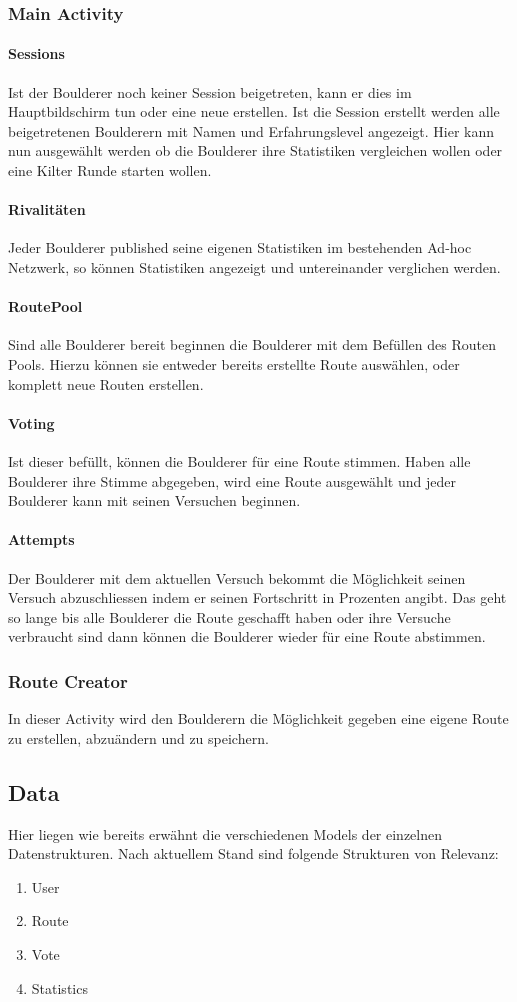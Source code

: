 \documentclass[11pt,a4paper,headsepline,footsepline,bibliography=totocnumbered]{article}
\newcommand{\subsubsubsection}[1]{\paragraph{#1}\mbox{}}
\begin{document}
    \newpage
    \subsubsection{Main Activity}

      \subsubsubsection{Sessions}
        \par
          Ist der Boulderer noch keiner Session beigetreten, kann er dies im Hauptbildschirm tun oder eine neue erstellen.
          Ist die Session erstellt werden alle beigetretenen Boulderern mit Namen und Erfahrungslevel angezeigt.
          Hier kann nun ausgewählt werden ob die Boulderer ihre Statistiken vergleichen wollen oder eine Kilter Runde starten wollen.

      \subsubsubsection{Rivalitäten}
        \par
          Jeder Boulderer published seine eigenen Statistiken im bestehenden Ad-hoc Netzwerk, so können Statistiken angezeigt und untereinander verglichen werden.

      \subsubsubsection{RoutePool}
        \par
          Sind alle Boulderer bereit beginnen die Boulderer mit dem Befüllen des Routen Pools.
          Hierzu können sie entweder bereits erstellte Route auswählen, oder komplett neue Routen erstellen.

      \subsubsubsection{Voting}
        \par
          Ist dieser befüllt, können die Boulderer für eine Route stimmen.
          Haben alle Boulderer ihre Stimme abgegeben, wird eine Route ausgewählt und jeder Boulderer kann mit seinen Versuchen beginnen.

      \subsubsubsection{Attempts}
        \par
          Der Boulderer mit dem aktuellen Versuch bekommt die Möglichkeit seinen Versuch abzuschliessen indem er seinen Fortschritt in Prozenten angibt.
          Das geht so lange bis alle Boulderer die Route geschafft haben oder ihre Versuche verbraucht sind dann können die Boulderer wieder für eine Route abstimmen.

    \subsubsection{Route Creator}
      \par
        In dieser Activity wird den Boulderern die Möglichkeit gegeben eine eigene Route zu erstellen, abzuändern und zu speichern.


  \subsection{Data}
    \par
      Hier liegen wie bereits erwähnt die verschiedenen Models der einzelnen Datenstrukturen.
      Nach aktuellem Stand sind folgende Strukturen von Relevanz:
      \begin{enumerate}
        \item User
        \item Route
        \item Vote
        \item Statistics
      \end{enumerate}
\end{document}

